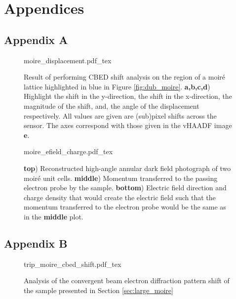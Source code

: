 \chapter{Appendices}

\section{Appendix A}
\label{appendix:a}

\begin{figure}[b]
    \centering
    \def\svgwidth{.95\linewidth}
    {moire_displacement.pdf_tex}
    \caption{Result of performing CBED shift analysis on the region of a moiré lattice highlighted in blue in Figure \ref{fig:dub_moire}. \textbf{a,b,c,d}) Highlight the shift in the y-direction, the shift in the x-direction, the magnitude of the shift, and, the angle of the displacement respectively. All values are given are (sub)pixel shifts across the sensor. The axes correspond with those given in the vHAADF image \textbf{e}.}
    \label{fig:m_dis}
\end{figure}

\begin{figure}[H]
    \centering
    \def\svgwidth{.5\linewidth}
    {moire_efield_charge.pdf_tex}
    \caption{\textbf{top}) Reconstructed high-angle annular dark field photograph of two moiré unit cells. \textbf{middle}) Momentum transferred to the passing electron probe by the sample. \textbf{bottom}) Electric field direction and charge density that would create the electric field such that the momentum transferred to the electron probe would be the same as in the \textbf{middle} plot.}
    \label{fig:m_mom}
\end{figure}

\section{Appendix B}
\label{appendix:b}
\begin{figure}[H]
    \centering
    \def\svgwidth{.7\linewidth}
    {trip_moire_cbed_shift.pdf_tex}
    \caption{Analysis of the convergent beam electron diffraction pattern shift of the sample presented in Section \ref{sec:large_moire}}
    \label{fig:appendix_cbed_trip_moire}
\end{figure}


\subsection*{}
